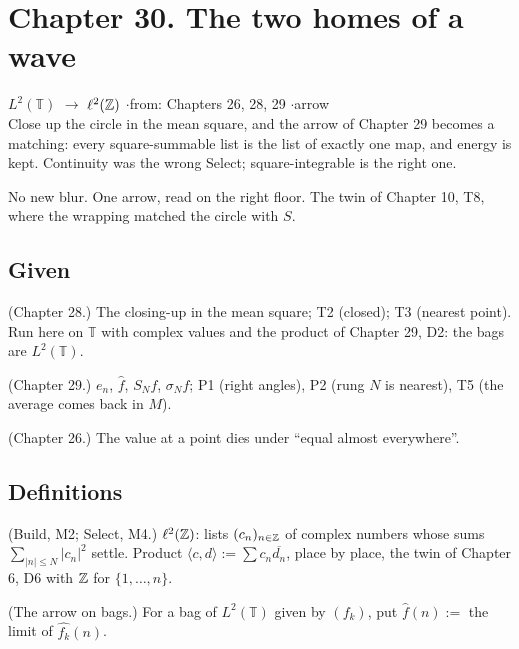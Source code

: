 \newpage

\section*{Chapter 30. The two homes of a wave}
\begin{center}
{\normalsize $L^2(\mathbb{T})$ $\to$ $\ell^2(\mathbb{Z})$ \quad$\cdot$\quad from: Chapters 26, 28, 29 \quad$\cdot$\quad arrow}\\[4pt]
{\small Close up the circle in the mean square, and the arrow of Chapter 29 becomes a matching: every square-summable list is the list of exactly one map, and energy is kept. Continuity was the wrong Select; square-integrable is the right one.}
\end{center}

No new blur. One arrow, read on the right floor. The twin of Chapter 10, T8, where the wrapping matched the circle with $S$.

\subsection*{Given}

\begin{lines}
\item[\lab{G1}] (Chapter 28.) The closing-up in the mean square; T2 (closed); T3 (nearest point). Run here on $\mathbb{T}$ with complex values and the product of Chapter 29, D2: the bags are $L^2(\mathbb{T})$.
\item[\lab{G2}] (Chapter 29.) $e_n$, $\widehat f$, $S_N f$, $\sigma_N f$; P1 (right angles), P2 (rung $N$ is nearest), T5 (the average comes back in $M$).
\item[\lab{G3}] (Chapter 26.) The value at a point dies under ``equal almost everywhere''.
\end{lines}

\subsection*{Definitions}

\begin{lines}
\item[\lab{D1}] (Build, M2; Select, M4.) $\ell^2(\mathbb{Z})$: lists $(c_n)_{n \in \mathbb{Z}}$ of complex numbers whose sums $\sum_{|n| \le N} |c_n|^2$ settle. Product $\langle c, d \rangle := \sum c_n \overline{d_n}$, place by place, the twin of Chapter 6, D6 with $\mathbb{Z}$ for $\{1, \dots, n\}$.
\item[\lab{D2}] (The arrow on bags.) For a bag of $L^2(\mathbb{T})$ given by $(f_k)$, put $\widehat f(n) := $ the limit of $\widehat{f_k}(n)$.
\end{lines}

